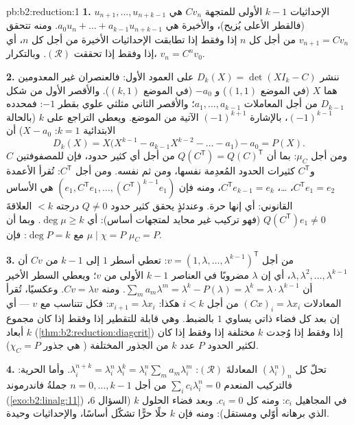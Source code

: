 \begin{solution}{pb:b2:reduction:1}
\textbf{1.} الإحداثيات $k - 1$ الأولى للمتجهة $Cv_n$ هي $u_{n+1},
\dots, u_{n+k-1}$ (فالقطر الأعلى يُزيح)، والأخيرة هي
$a_0 u_n + \dots + a_{k-1}u_{n+k-1}$. ومنه تتحقق $v_{n+1} = Cv_n$
من أجل كل $n$ إذا وفقط إذا تطابقت الإحداثيات الأخيرة من أجل كل $n$، أي إذا وفقط إذا
تحققت $(\mathcal R)$. وبالتكرار، $v_n = C^nv_0$.

\textbf{2.} ننشر $D_k(X) = \det(XI_k - C)$ على العمود
الأول: فالعنصران غير المعدومين هما $X$ (في الموضع $(1,1)$) و
$-a_0$ (في الموضع $(k,1)$). والأقصر الأول من شكل $D_{k-1}$
من أجل المعاملات $a_1, \dots, a_{k-1}$؛ والأقصر الثاني
مثلثي علوي بقطر $-1$: فمحدده $(-1)^{k-1}$،
بالإشارة $(-1)^{k+1}$ الآتية من الموضع. ويعطي التراجع على $k$
(بالحالة الابتدائية $k = 1$: $X - a_0$) أن
\[
D_k(X) = X\bigl(X^{k-1} - a_{k-1}X^{k-2} - \dots - a_1\bigr) -
a_0 = P(X).
\]
ومن أجل $\mu_C$: بما أن $Q(C^{\mathsf T}) = Q(C)^{\mathsf T}$ من أجل أي
كثير حدود، فإن للمصفوفتين $C$ و$C^{\mathsf T}$ كثيرات الحدود المُعدِمة نفسها،
ومن ثم  نفسه. ومن أجل $C^{\mathsf T}$: تُقرأ
الأعمدة $C^{\mathsf T}e_1 = e_2$، \dots، $C^{\mathsf
T}e_{k-1} = e_k$، ومنه فإن $(e_1, C^{\mathsf T}e_1, \dots, (C^{\mathsf
T})^{k-1}e_1)$ هي الأساس القانوني: أي إنها حرة. وعندئذٍ يحقق كثير حدود $Q
\neq 0$ درجته $< k$ العلاقةَ $Q(C^{\mathsf T})e_1 \neq 0$
(فهو تركيب غير محايد لمتجهات أساس): أي $\deg\mu \geq
k$. وبما أن $\mu \mid \chi = P$ مع $\deg P = k$: فإن $\mu_C = P$.

\textbf{3.} من أجل $v = (1, \lambda, \dots, \lambda^{k-1})^{\mathsf
T}$: تعطي أسطر $1$ إلى $k-1$ من $Cv$ أن $\lambda, \lambda^2, \dots,
\lambda^{k-1}$، أي إن $\lambda$ مضروبًا في العناصر $k - 1$ الأولى
من $v$؛ ويعطي السطر الأخير أن $\sum_m a_m\lambda^m = \lambda^k -
P(\lambda) = \lambda^k = \lambda\cdot\lambda^{k-1}$. ومنه $Cv =
\lambda v$. وعكسيًا، تُقرأ المعادلات $(Cx)_i = \lambda x_i$ من أجل
$i < k$ هكذا: $x_{i+1} = \lambda x_i$: فكل 
تتناسب مع $v$ --- أي إن بعد كل فضاء ذاتي يساوي
$1$ بالضبط. وهي قابلة للتقطير إذا وفقط إذا كان مجموع أبعاد  $k$
(\cref{thm:b2:reduction:diagcrit}) إذا وفقط إذا وُجدت $k$ 
مختلفة إذا وفقط إذا كان لكثير الحدود $P$ عدد $k$ من الجذور المختلفة ( هي
جذور $\chi_C = P$).

\textbf{4.} تحلّ كل $(\lambda_i^n)_n$ المعادلةَ $(\mathcal R)$:
$\lambda_i^{n+k} = \lambda_i^n\,\lambda_i^k =
\lambda_i^n\sum_m a_m\lambda_i^m$. وأما الحرية: فالتركيب المنعدم
$\sum_i c_i\lambda_i^n = 0$ من أجل $n = 0, \dots, k-1$
جملةُ فاندرموند (\cref{exo:b2:linalg:11}) في المجاهيل $c_i$:
ومنه كل $c_i = 0$. وبعد فضاء الحلول $k$ (السؤال 6،
الذي برهانه أوّلي ومستقل): ومنه فإن $k$ حلًا حرًّا
تشكّل أساسًا، والإحداثيات وحيدة.


\end{solution}
